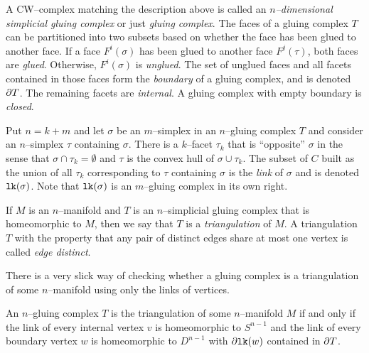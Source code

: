 \begin{defn}
  A CW--complex matching the description above is called an \emph{$n$--dimensional simplicial gluing complex} or just \emph{gluing complex}.
  The faces of a gluing complex $T$ can be partitioned into two subsets based on whether the face has been glued to another face.
  If a face $F^i(\sigma)$ has been glued to another face $F^j(\tau)$, both faces are \emph{glued}.
  Otherwise, $F^i(\sigma)$ is \emph{unglued}.
  The set of unglued faces and all facets contained in those faces form the \emph{boundary} of a gluing complex, and is denoted $\partial T$.
  The remaining facets are \emph{internal}.
  A gluing complex with empty boundary is \emph{closed}.

  Put $n=k+m$ and let $\sigma$ be an $m$--simplex in an $n$--gluing complex $T$ and consider an $n$--simplex $\tau$ containing $\sigma$.
  There is a $k$--facet $\tau_k$ that is ``opposite'' $\sigma$ in the sense that $\sigma\cap\tau_k=\emptyset$ and $\tau$ is the convex hull of $\sigma\cup\tau_k$.
  The subset of $C$ built as the union of all $\tau_k$ corresponding to $\tau$ containing $\sigma$ is the \emph{link} of $\sigma$ and is denoted $\texttt{lk}(\sigma)$.
  Note that $\texttt{lk}(\sigma)$ is an $m$--gluing complex in its own right.

  If $M$ is an $n$--manifold and $T$ is an $n$--simplicial gluing complex that is homeomorphic to $M$, then we say that $T$ is a \emph{triangulation} of $M$.
  A triangulation $T$ with the property that any pair of distinct edges share at most one vertex is called \emph{edge distinct}.
\end{defn}

There is a very slick way of checking whether a gluing complex is a triangulation of some $n$--manifold using only the links of vertices.

\begin{theorem}
  An $n$--gluing complex $T$ is the triangulation of some $n$--manifold $M$ if and only if the link of every internal vertex $v$ is homeomorphic to $S^{n-1}$ and the link of every boundary vertex $w$ is homeomorphic to $D^{n-1}$ with $\partial\texttt{lk}(w)$ contained in $\partial T$.
\end{theorem}

